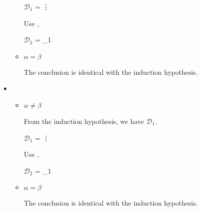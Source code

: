 \begin{itemize}
\begin{itemize}
	      	      $\mathcal{D}_1$ = 
	      	      {\vdots}
	      	      	      	      	      	      	      	      
	      	      Use \KTW,
	      	      	      	      	      	      	      	      
	      	      $\mathcal{D}_2$ = 
	      	      {_1}
	      	      	      	      	      	      	      	      
	      	\item $\alpha = \beta$
	      	      	      	      	      	      	      	      
	      	      The conclusion is identical with the induction hypothesis.
	      	      	      	      	      	      	      	      
	      \end{itemize}
	      	      	      	      
	\item \KTWL
	      	      	      	      
	      \begin{itemize}
	      		      		      		      	
	      	\item $\alpha \neq \beta$
	      	      	      	      	      	      	      	      
	      	      From the induction hypothesis, we have $\mathcal{D}_1$.
	      	      	      	      	      	      	      	      
	      	      $\mathcal{D}_1$ = 
	      	      {\vdots}
	      	      	      	      	      	      	      	      
	      	      Use \KTWL,
	      	      	      	      	      	      	      	      
	      	      $\mathcal{D}_2$ = 
	      	      {_1}
	      	      	      	      	      	      
	      	\item $\alpha = \beta$
	      	      	      	      	      	      
	      	      The conclusion is identical with the induction hypothesis.
	      	      	      	      	      	      
	      \end{itemize}
	      	      	      

\end{itemize}

